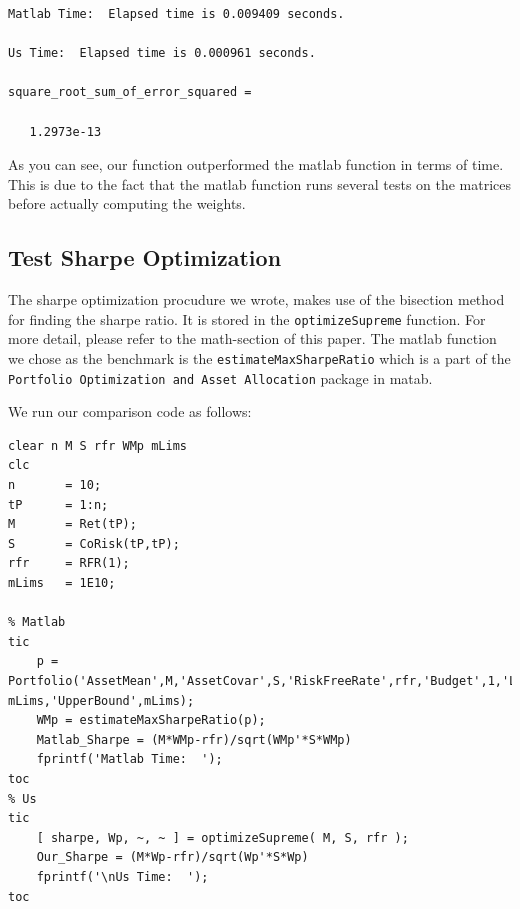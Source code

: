 \documentclass[12pt]{article}
\begin{document}
        \color{lightgray} \begin{verbatim}Matlab Time:  Elapsed time is 0.009409 seconds.

Us Time:  Elapsed time is 0.000961 seconds.

square_root_sum_of_error_squared =

   1.2973e-13

\end{verbatim} \color{black}
    \begin{par}
As you can see, our function outperformed the matlab function in terms of time. This is due to the fact that the matlab function runs several tests on the matrices before actually computing the weights.
\end{par} \vspace{1em}


\subsection*{Test Sharpe Optimization}

\begin{par}
The sharpe optimization procudure we wrote, makes use of the bisection method for finding the sharpe ratio. It is stored in the \texttt{optimizeSupreme} function. For more detail, please refer to the math-section of this paper. The matlab function we chose as the benchmark is the \texttt{estimateMaxSharpeRatio} which is a part of the \texttt{Portfolio Optimization and Asset Allocation} package in matab.
\end{par} \vspace{1em}
\begin{par}
We run our comparison code as follows:
\end{par} \vspace{1em}
\begin{verbatim}
clear n M S rfr WMp mLims
clc
n       = 10;
tP      = 1:n;
M       = Ret(tP);
S       = CoRisk(tP,tP);
rfr     = RFR(1);
mLims   = 1E10;

% Matlab
tic
    p =  Portfolio('AssetMean',M,'AssetCovar',S,'RiskFreeRate',rfr,'Budget',1,'LowerBound',-mLims,'UpperBound',mLims);
    WMp = estimateMaxSharpeRatio(p);
    Matlab_Sharpe = (M*WMp-rfr)/sqrt(WMp'*S*WMp)
    fprintf('Matlab Time:  ');
toc
% Us
tic
    [ sharpe, Wp, ~, ~ ] = optimizeSupreme( M, S, rfr );
    Our_Sharpe = (M*Wp-rfr)/sqrt(Wp'*S*Wp)
    fprintf('\nUs Time:  ');
toc
\end{verbatim}
\end{document}
